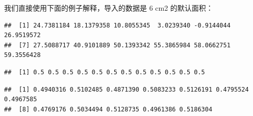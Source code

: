 \documentclass[
]{krantz}
\makeatletter
\newenvironment{Shaded}{\begin{snugshade}}{\end{snugshade}}
\newcommand{\AttributeTok}[1]{\textcolor[rgb]{0.77,0.63,0.00}{#1}}
\newcommand{\DecValTok}[1]{\textcolor[rgb]{0.00,0.00,0.81}{#1}}
\newcommand{\FloatTok}[1]{\textcolor[rgb]{0.00,0.00,0.81}{#1}}
\newcommand{\FunctionTok}[1]{\textcolor[rgb]{0.00,0.00,0.00}{#1}}
\newcommand{\NormalTok}[1]{#1}
\newcommand{\OtherTok}[1]{\textcolor[rgb]{0.56,0.35,0.01}{#1}}
\newcommand{\SpecialCharTok}[1]{\textcolor[rgb]{0.00,0.00,0.00}{#1}}
\newcommand{\StringTok}[1]{\textcolor[rgb]{0.31,0.60,0.02}{#1}}
\newenvironment{kframe}{%
\medskip{}
\setlength{\fboxsep}{.8em}
 \def\at@end@of@kframe{}%
 \ifinner\ifhmode%
  \def\at@end@of@kframe{\end{minipage}}%
  \begin{minipage}{\columnwidth}%
 \fi\fi%
 \def\FrameCommand##1{\hskip\@totalleftmargin \hskip-\fboxsep
 \colorbox{shadecolor}{##1}\hskip-\fboxsep
     \hskip-\linewidth \hskip-\@totalleftmargin \hskip\columnwidth}%
 \MakeFramed {\advance\hsize-\width
   \@totalleftmargin\z@ \linewidth\hsize
   \@setminipage}}%
 {\par\unskip\endMakeFramed%
 \at@end@of@kframe}
\renewenvironment{Shaded}{\begin{kframe}}{\end{kframe}}
\makeatother
\begin{document}
我们直接使用下面的例子解释，导入的数据是 6 cm2 的默认面积：

\begin{Shaded}
\end{Shaded}

\begin{verbatim}
##  [1] 24.7381184 18.1379358 10.8055345  3.0239340 -0.9144044 26.9519572
##  [7] 27.5088717 40.9101889 50.1393342 55.3865984 58.0662751 59.3556428
\end{verbatim}

\begin{Shaded}
\end{Shaded}

\begin{verbatim}
##  [1] 0.5 0.5 0.5 0.5 0.5 0.5 0.5 0.5 0.5 0.5 0.5 0.5
\end{verbatim}

\begin{Shaded}
\end{Shaded}

\begin{verbatim}
##  [1] 0.4940316 0.5102485 0.4871390 0.5083233 0.5126191 0.4795524 0.4967585
##  [8] 0.4769176 0.5034494 0.5128735 0.4961386 0.5186304
\end{verbatim}
\end{document}
